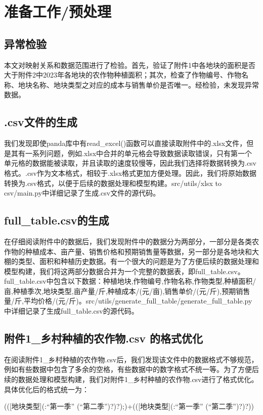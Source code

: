 \documentclass{cumcmthesis}
\begin{document}
\section{准备工作/预处理}
\subsection{异常检验}
本文对映射关系和数据范围进行了检验。首先，验证了附件1中各地块的面积是否大于附件2中2023年各地块的农作物种植面积；其次，检查了作物编号、作物名称、地块名称、地块类型之对应的成本与销售单价是否唯一。经检验，未发现异常数据。
\subsection{.csv文件的生成}
我们发现即使panda库中有read\_excel()函数可以直接读取附件中的.xlsx文件，但是其有一系列问题，例如.xlsx中合并的单元格会导致数据读取错误，只有第一个单元格的数据能被读取，并且读取的速度较慢等，因此我们选择将数据转换为.csv格式。.csv作为文本格式，相较于.xlsx格式更加方便处理。因此，我们将原始数据转换为.csv格式，以便于后续的数据处理和模型构建。src/utils/xlsx to csv/main.py中详细记录了生成.csv文件的源代码。

\subsection{full\_table.csv的生成}
在仔细阅读附件中的数据后，我们发现附件中的数据分为两部分，一部分是各类农作物的种植成本、亩产量、销售价格和预期销售量等数据，另一部分是各地块和大棚的类型、面积和种植历史数据。有一个很大的问题是为了方便后续的数据处理和模型构建，我们将这两部分数据合并为一个完整的数据表，即full\_table.csv。full\_table.csv中包含以下数据：种植地块,作物编号,作物名称,作物类型,种植面积/亩,种植季次,地块类型,亩产量/斤,种植成本/(元/亩),销售单价/(元/斤),预期销售量/斤,平均价格/(元/斤)。src/utils/generate\_full\_table/generate\_full\_table.py中详细记录了生成full\_table.csv的源代码。

\subsection{附件1\_乡村种植的农作物.csv 的格式优化}
在阅读附件1\_乡村种植的农作物.csv后，我们发现该文件中的数据格式不够规范，例如有些数据中包含了多余的空格，有些数据中的数字格式不统一等。为了方便后续的数据处理和模型构建，我们对附件1\_乡村种植的农作物.csv进行了格式优化。具体优化后的格式统一为：
\begin{tcode}
    (([地块类型](:“第一季” (“第二季”)?)?);)+(([地块类型](:“第一季” (“第二季”)?)?))
\end{tcode}
\end{document}
